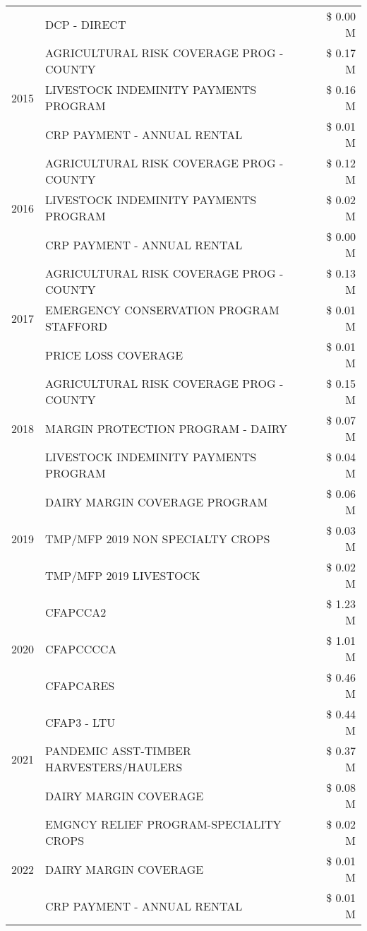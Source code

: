 \begin{tabular}{llr}
 & DCP - DIRECT & \$ 0.00 M \\
\cline{1-3}
\multirow[t]{3}{*}{2015} & AGRICULTURAL RISK COVERAGE PROG - COUNTY & \$ 0.17 M \\
 & LIVESTOCK INDEMINITY PAYMENTS PROGRAM & \$ 0.16 M \\
 & CRP PAYMENT - ANNUAL RENTAL & \$ 0.01 M \\
\cline{1-3}
\multirow[t]{3}{*}{2016} & AGRICULTURAL RISK COVERAGE PROG - COUNTY & \$ 0.12 M \\
 & LIVESTOCK INDEMINITY PAYMENTS PROGRAM & \$ 0.02 M \\
 & CRP PAYMENT - ANNUAL RENTAL & \$ 0.00 M \\
\cline{1-3}
\multirow[t]{3}{*}{2017} & AGRICULTURAL RISK COVERAGE PROG - COUNTY & \$ 0.13 M \\
 & EMERGENCY CONSERVATION PROGRAM STAFFORD & \$ 0.01 M \\
 & PRICE LOSS COVERAGE & \$ 0.01 M \\
\cline{1-3}
\multirow[t]{3}{*}{2018} & AGRICULTURAL RISK COVERAGE PROG - COUNTY & \$ 0.15 M \\
 & MARGIN PROTECTION PROGRAM - DAIRY & \$ 0.07 M \\
 & LIVESTOCK INDEMINITY PAYMENTS PROGRAM & \$ 0.04 M \\
\cline{1-3}
\multirow[t]{3}{*}{2019} & DAIRY MARGIN COVERAGE PROGRAM & \$ 0.06 M \\
 & TMP/MFP 2019 NON SPECIALTY CROPS & \$ 0.03 M \\
 & TMP/MFP 2019 LIVESTOCK & \$ 0.02 M \\
\cline{1-3}
\multirow[t]{3}{*}{2020} & CFAPCCA2 & \$ 1.23 M \\
 & CFAPCCCCA & \$ 1.01 M \\
 & CFAPCARES & \$ 0.46 M \\
\cline{1-3}
\multirow[t]{3}{*}{2021} & CFAP3 - LTU & \$ 0.44 M \\
 & PANDEMIC ASST-TIMBER HARVESTERS/HAULERS & \$ 0.37 M \\
 & DAIRY MARGIN COVERAGE & \$ 0.08 M \\
\cline{1-3}
\multirow[t]{3}{*}{2022} & EMGNCY RELIEF PROGRAM-SPECIALITY CROPS & \$ 0.02 M \\
 & DAIRY MARGIN COVERAGE & \$ 0.01 M \\
 & CRP PAYMENT - ANNUAL RENTAL & \$ 0.01 M \\
\cline{1-3}
\bottomrule
\end{tabular}
